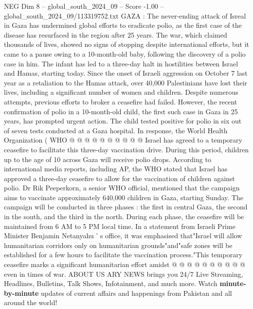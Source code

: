 \begin{textsample}{NEG Dim 8 – global\_south\_2024\_09 – Score -1.00 – global\_south\_2024\_09/113319752.txt}  \label{ex:f8_neg_161}
GAZA : The never-ending attack of Isreal in Gaza has undermined global efforts to eradicate polio, as the first case of the disease has resurfaced in the region after 25 years.
The war, which claimed thousands of lives, showed no signs of stopping despite international efforts, but it came to a pause owing to a 10-month-old baby, following the discovery of a polio case in him.
The infant has led to a three-day halt in hostilities between Israel and Hamas, starting today.
Since the onset of Israeli aggression on October 7 last year as a retaliation to the Hamas attack, over 40,000 Palestinians have lost their lives, including a significant number of women and children.
Despite numerous attempts, previous efforts to broker a ceasefire had failed.
However, the recent confirmation of polio in a 10-month-old child, the first such case in Gaza in 25 years, has prompted urgent action.
The child tested positive for polio in six out of seven tests conducted at a Gaza hospital.
In response, the World Health Organization ( WHO @ @ @ @ @ @ @ @ @ @ Israel has agreed to a temporary ceasefire to facilitate this three-day vaccination drive.
During this period, children up to the age of 10 across Gaza will receive polio drops.
According to international media reports, including AP, the WHO stated that Israel has approved a three-day ceasefire to allow for the vaccination of children against polio.
Dr Rik Peeperkorn, a senior WHO official, mentioned that the campaign aims to vaccinate approximately 640,000 children in Gaza, starting Sunday.
The campaign will be conducted in three phases : the first in central Gaza, the second in the south, and the third in the north.
During each phase, the ceasefire will be maintained from 6 AM to 5 PM local time.
In a statement from Israeli Prime Minister Benjamin Netanyahu ' s office, it was emphasised that"Israel will allow humanitarian corridors only on humanitarian grounds"and"safe zones will be established for a few hours to facilitate the vaccination process."This temporary ceasefire marks a significant humanitarian effort amidst @ @ @ @ @ @ @ @ @ @ even in times of war.
ABOUT US ARY NEWS brings you 24/7 Live Streaming, Headlines, Bulletins, Talk Shows, Infotainment, and much more.
Watch \textbf{minute-by-minute} updates of current affairs and happenings from Pakistan and all around the world!

\end{textsample}
